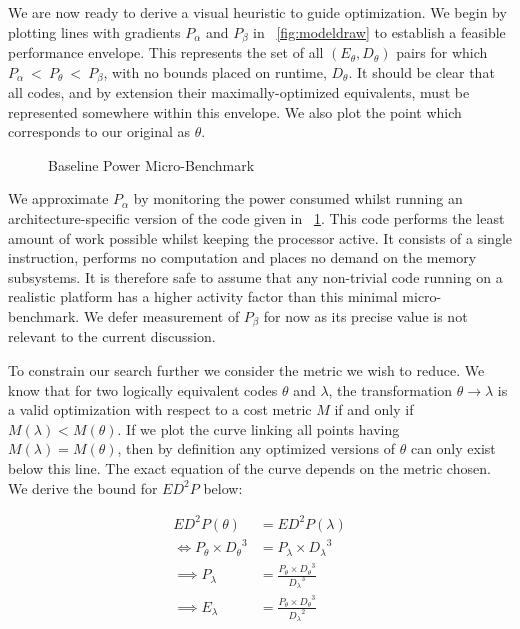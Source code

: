 We are now ready to derive a visual heuristic to guide optimization. We begin by plotting lines with gradients $P_{\alpha}$ and $P_{\beta}$ in \figurename~\ref{fig:modeldraw} to establish a feasible performance envelope. This represents the set of all $(E_\theta, D_\theta)$ pairs for which $P_{\alpha}~<~P_\theta~<~P_{\beta}$, with no bounds placed on runtime, $D_\theta$. It should be clear that all codes,  and by extension their maximally-optimized equivalents, must be represented somewhere within this envelope. We also plot the point which corresponds to our original as $\theta$.

\begin{figure}[ht]                                                               
\centering                                                                      
\lstset{basicstyle=\ttfamily\footnotesize\bfseries,                             
      frame=tb}                                                                 
                             
\caption{Baseline Power Micro-Benchmark}                            
\label{fig:microbench}                                                           
\end{figure}  

We approximate $P_{\alpha}$ by monitoring the power consumed whilst running an architecture-specific version of the code given in \figurename~\ref{fig:microbench}. This code performs the least amount of work possible whilst keeping the processor active. It consists of a single instruction, performs no computation and places no demand on the memory subsystems. It is therefore safe to assume that any non-trivial code running on a realistic platform has a higher activity factor than this minimal micro-benchmark. We defer measurement of $P_{\beta}$ for now as its precise value is not relevant to the current discussion.


To constrain our search further we consider the metric we wish to reduce. We know that for two logically equivalent codes $\theta$ and $\lambda$, the transformation $\theta \to \lambda$ is a valid optimization with respect to a cost metric $M$ if and only if $M(\lambda) < M(\theta)$. If we plot the curve linking all points having $M(\lambda) = M(\theta)$, then by definition any optimized versions of $\theta$ can only exist below this line. The exact equation of the curve depends on the metric chosen. We derive the bound for $ED^2P$ below:

\begin{align}
ED^2P(\theta) &= ED^2P(\lambda) \nonumber \\
\Leftrightarrow P_{\theta} \times {D_{\theta}}^{3} &= P_{\lambda} \times {D_{\lambda}}^{3} \nonumber \\
\implies P_{\lambda} &= \frac{P_{\theta} \times {D_{\theta}}^{3}}{{D_{\lambda}}^3} \nonumber \\
\implies E_{\lambda} &= \frac{P_{\theta} \times {D_{\theta}}^{3}}{{D_{\lambda}}^2}
\end{align}

